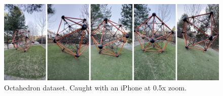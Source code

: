 \begin{figure}[h]
    \centering
    \includegraphics[width=1.0\textwidth]{figures/octahedron-dataset.png}
    \caption{Octahedron dataset. Caught with an iPhone at 0.5x zoom.}
    \label{fig:octahedron-dataset}
\end{figure}